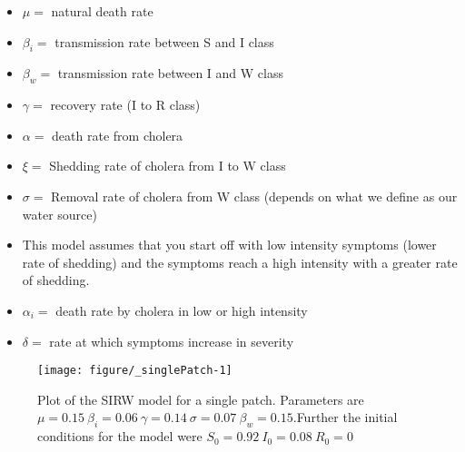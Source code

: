\documentclass[12pt]{article}\usepackage[]{graphicx}\usepackage[]{color}
\makeatletter
\def\maxwidth{ %
  \ifdim\Gin@nat@width>\linewidth
    \linewidth
  \else
    \Gin@nat@width
  \fi
}
\newenvironment{knitrout}{}{} %
\makeatother
\begin{document}
	\begin{itemize}
		\item$\mu=$ natural death rate
		\item$\beta_i=$ transmission rate between S and I class
		\item$\beta_w=$ transmission rate between I and W class
		\item$\gamma=$ recovery rate (I to R class)
		\item$\alpha=$ death rate from cholera
		\item$\xi=$ Shedding rate of cholera from I to W class
		\item$\sigma=$	Removal rate of cholera from W class (depends on what we define as our water source)
	\end{itemize}

\begin{itemize}
	\item This model assumes that you start off with low intensity symptoms (lower rate of shedding) and the symptoms reach a high intensity with a greater rate of shedding.
	\item$\alpha_i=$ death rate by cholera in low or high intensity
	\item$\delta =$ rate at which symptoms increase in severity
\end{itemize}


\begin{knitrout}
\color{fgcolor}\begin{figure}
\texttt{[image: figure/\_singlePatch-1]} \caption{\label{fig:singlepatch} Plot of the SIRW model for a single patch. Parameters are $\mu=0.15\ \beta_i=0.06\ \gamma=0.14\ \sigma=0.07\ \beta_w=0.15$.Further the initial conditions for the model were $S_0=0.92\ I_0=0.08\ R_0=0$}\label{fig:<singlePatch}
\end{figure}


\end{knitrout}
\FloatBarrier
\end{document}
